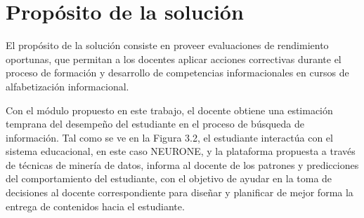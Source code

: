 \section{Propósito de la solución}
\label{sec:proposito-solucion}
El propósito de la solución consiste en proveer evaluaciones de rendimiento oportunas, que permitan a los docentes aplicar acciones correctivas durante el proceso de formación y desarrollo de competencias informacionales en cursos de alfabetización informacional.

Con el módulo propuesto en este trabajo, el docente obtiene una estimación temprana del desempeño del estudiante en el proceso de búsqueda de información. Tal como se ve en la Figura 3.2, el estudiante interactúa con el sistema educacional, en este caso NEURONE, y la plataforma propuesta a través de técnicas de minería de datos, informa al docente de los patrones y predicciones del comportamiento del estudiante, con el objetivo de ayudar en la toma de decisiones al docente correspondiente para diseñar y planificar de mejor forma la entrega de contenidos hacia el estudiante.